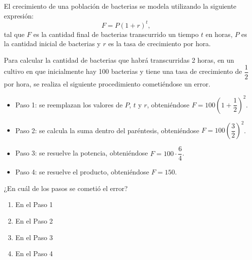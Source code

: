 \begin{problem}
    El crecimiento de una población de bacterias se modela utilizando la siguiente expresión:
    \[
    F = P(1 + r)^t,
    \]
    tal que $F$ es la cantidad final de bacterias transcurrido un tiempo $t$ en horas, $P$ es la cantidad inicial de bacterias y $r$ es la tasa de crecimiento por hora.

    Para calcular la cantidad de bacterias que habrá transcurridas 2 horas, en un cultivo en que inicialmente hay 100 bacterias y tiene una tasa de crecimiento de $\dfrac{1}{2}$ por hora, se realiza el siguiente procedimiento cometiéndose un error.

    \begin{itemize}
        \item Paso 1: se reemplazan los valores de $P$, $t$ y $r$, obteniéndose $F = 100\left(1 + \dfrac{1}{2}\right)^2$.
        \item Paso 2: se calcula la suma dentro del paréntesis, obteniéndose $F = 100\left(\dfrac{3}{2}\right)^2$.
        \item Paso 3: se resuelve la potencia, obteniéndose $F = 100 \cdot \dfrac{6}{4}$.
        \item Paso 4: se resuelve el producto, obteniéndose $F = 150$.
    \end{itemize}

    ¿En cuál de los pasos se cometió el error?

    \begin{enumerate}[label=\Alph*.]
        \item En el Paso 1
        \item En el Paso 2
        \item En el Paso 3
        \item En el Paso 4
    \end{enumerate}
\end{problem}
